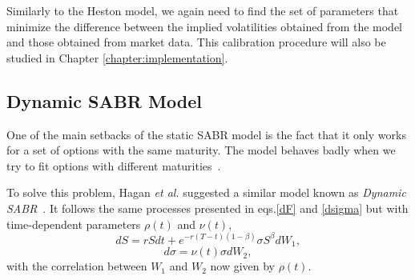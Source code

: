 Similarly to the Heston model, we again need to find the set of parameters that minimize the difference between the implied volatilities obtained from the model and those obtained from market data. This calibration procedure will also be studied in Chapter \ref{chapter:implementation}.


\subsection{Dynamic SABR Model}
One of the main setbacks of the static SABR model is the fact that it only works for a set of options with the same maturity. The model behaves badly when we try to fit options with different maturities~\cite{Hagan}. 

To solve this problem, Hagan \textit{et al.} suggested a similar model known as \emph{Dynamic SABR}~\cite{Hagan}. It follows the same processes presented in eqs.\eqref{dF} and \eqref{dsigma} but with time-dependent parameters $\rho(t)$ and $\nu(t)$,
\begin{equation}\label{dF2}
\boxed{dS=rSdt+e^{-r(T-t)(1-\beta)}\sigma S^\beta dW_1,}
\end{equation}
\begin{equation}\label{dsigma2}
\boxed{d\sigma=\nu(t)\sigma dW_2,}
\end{equation}
\noindent with the correlation between $W_1$ and $W_2$ now given by $\rho(t)$.



